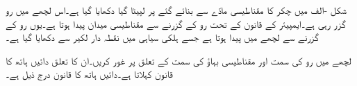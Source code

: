 
شکل -الف میں  چکر کا  مقناطیسی مادّے سے بنائے گئے  پر لپیٹا گیا  دکھایا گیا ہے۔اس لچھے میں  رو گزر رہی ہے۔ایمپیئر کے قانون کے تحت رو کے گزرنے سے مقناطیسی میدان پیدا ہوتا ہے۔یوں رو کے گزرنے سے لچھے میں   پیدا ہوتا ہے جسے ہلکی سیاہی میں نقطہ دار لکیر سے دکھایا گیا ہے۔

لچھے میں رو کی سمت اور مقناطیسی بہاؤ کی سمت کے تعلق پر غور کریں۔ان کا تعلق دائیں ہاتھ کا قانون کہلاتا ہے۔دائیں ہاتھ کا قانون درج ذیل ہے۔


